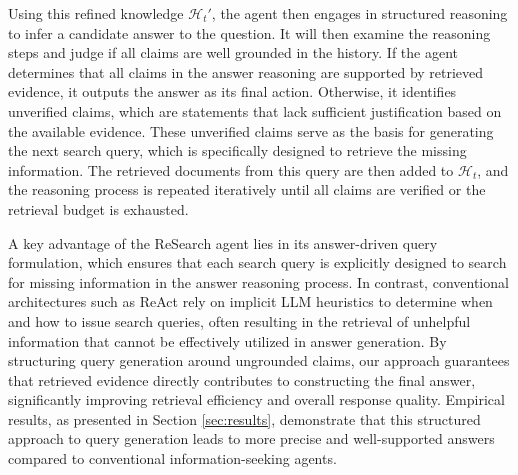 Using this refined knowledge $\mathcal{H}_t'$, the agent then engages in structured reasoning to infer a candidate answer to the question.
It will then examine the reasoning steps and judge if all claims are well grounded in the history.
If the agent determines that all claims in the answer reasoning are supported by retrieved evidence, it outputs the answer as its final action. Otherwise, it identifies unverified claims, which are statements that lack sufficient justification based on the available evidence. These unverified claims serve as the basis for generating the next search query, which is specifically designed to retrieve the missing information. The retrieved documents from this query are then added to $\mathcal{H}_t$, and the reasoning process is repeated iteratively until all claims are verified or the retrieval budget is exhausted.

A key advantage of the ReSearch agent lies in its answer-driven query formulation, which ensures that each search query is explicitly designed to search for missing information in the answer reasoning process. In contrast, conventional architectures such as ReAct rely on implicit LLM heuristics to determine when and how to issue search queries, often resulting in the retrieval of unhelpful information that cannot be effectively utilized in answer generation. By structuring query generation around ungrounded claims, our approach guarantees that retrieved evidence directly contributes to constructing the final answer, significantly improving retrieval efficiency and overall response quality. Empirical results, as presented in Section \ref{sec:results}, demonstrate that this structured approach to query generation leads to more precise and well-supported answers compared to conventional information-seeking agents.
